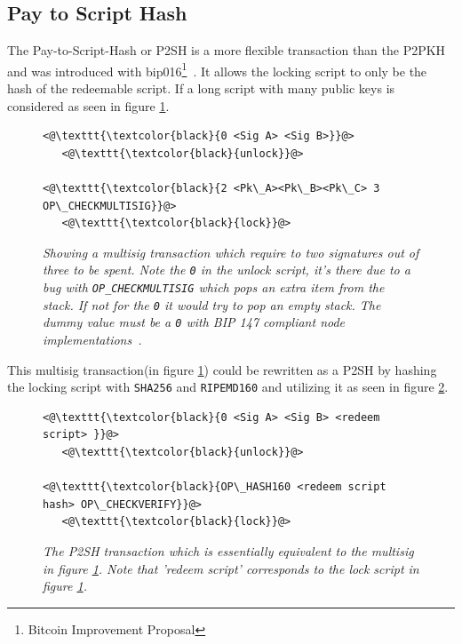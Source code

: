 \subsection{Pay to Script Hash}

The Pay-to-Script-Hash or P2SH is a more flexible transaction than the P2PKH and was introduced with \gls{bip}016\footnote{Bitcoin Improvement Proposal}~\cite{bip:0016:p2sh}. It allows the locking script to only be the hash of the redeemable script. If a long script with many public keys is considered as seen in figure \ref{fig:cumbersome:script}.

\newpage

\begin{figure}
	\centering
	\begin{lstlisting}
<@\texttt{\textcolor{black}{0 <Sig A> <Sig B>}}@>   
   <@\texttt{\textcolor{black}{unlock}}@>
	
<@\texttt{\textcolor{black}{2 <Pk\_A><Pk\_B><Pk\_C> 3 OP\_CHECKMULTISIG}}@>
   <@\texttt{\textcolor{black}{lock}}@>
	\end{lstlisting}
	
	\caption{\textit{ Showing a multisig transaction which require to two signatures out of three to be spent. Note the \texttt{0} in the unlock script, it's there due to a bug with \texttt{OP\_CHECKMULTISIG} which pops an extra item from the stack. If not for the \texttt{0} it would try to pop an empty stack. The dummy value must be a \texttt{0} with BIP 147 compliant \gls{node} implementations~\cite{bip:0147:dummy:zero}.
	}}
	\label{fig:cumbersome:script}
\end{figure} 

This multisig transaction(in figure \ref{fig:cumbersome:script}) could be rewritten as a P2SH by hashing the locking script with \texttt{SHA256} and  \texttt{RIPEMD160} and utilizing it as seen in figure \ref{fig:p2sh}.

\begin{figure}[hbt!]
	
	\begin{lstlisting}
<@\texttt{\textcolor{black}{0 <Sig A> <Sig B> <redeem script> }}@>   
   <@\texttt{\textcolor{black}{unlock}}@>
	
<@\texttt{\textcolor{black}{OP\_HASH160 <redeem script hash> OP\_CHECKVERIFY}}@>
   <@\texttt{\textcolor{black}{lock}}@>
	\end{lstlisting}
	
	\caption{\textit{ The P2SH transaction which is essentially equivalent to the multisig in figure \ref{fig:cumbersome:script}.
			Note that 'redeem script' corresponds to the lock script in figure \ref{fig:cumbersome:script}.
	}}
	\label{fig:p2sh}
\end{figure}

